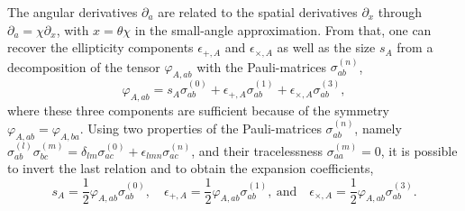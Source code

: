 \documentclass[a4paper,fleqn,usenatbib]{mnras}
\begin{document}
The angular derivatives $\partial_a$ are related to the spatial derivatives $\partial_x$ through $\partial_a = \chi\partial_x$, with $x=\theta\chi$ in the small-angle approximation. From that, one can recover the ellipticity components $\epsilon_{+,A}$ and $\epsilon_{\times,A}$ as well as the size $s_A$ from a decomposition of the tensor $\varphi_{A,ab}$ with the Pauli-matrices $\sigma_{ab}^{(n)}$,
\begin{equation}
\varphi_{A,ab} = s_A\sigma^{(0)}_{ab} + \epsilon_{+,A}\sigma^{(1)}_{ab} + \epsilon_{\times,A}\sigma^{(3)}_{ab},
\end{equation}
where these three components are sufficient because of the symmetry $\varphi_{A,ab} = \varphi_{A,ba}$. Using two properties of the Pauli-matrices $\sigma_{ab}^{(n)}$, namely $\sigma_{ab}^{(l)}\sigma_{bc}^{(m)} = \delta_{lm}\sigma^{(0)}_{ac} + \epsilon_{lmn}\sigma^{(n)}_{ac}$, and their tracelessness $\sigma^{(m)}_{aa} = 0$, it is possible to invert the last relation and to obtain the expansion coefficients,
\begin{equation}
s_A = \frac{1}{2}\varphi_{A,ab}\sigma^{(0)}_{ab},
\quad
\epsilon_{+,A} = \frac{1}{2}\varphi_{A,ab}\sigma^{(1)}_{ab},
\mathrm{~and}\quad
\epsilon_{\times,A} = \frac{1}{2}\varphi_{A,ab}\sigma^{(3)}_{ab}.
\end{equation}
\end{document}
